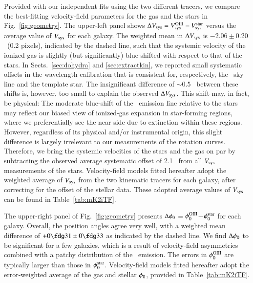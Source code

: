 \documentclass[traditabstract]{aa} %
\begin{document}
Provided with our independent fits using the two different tracers, we compare
the best-fitting velocity-field parameters for the gas and the stars in
Fig.~\ref{fig:geometry}. The upper-left panel shows $\Delta V_{\rm sys}=V_{\rm sys}^{\rm
OIII}-V_{\rm sys}^{\rm star}$ versus the average value of $V_{\rm sys}$ for each galaxy.
The weighted mean in $\Delta V_{\rm sys}$ is $-2.06 \pm 0.20$ \kms\ (0.2 pixels),
indicated by the dashed line, such that the systemic velocity of the ionized gas
is slightly (but significantly) blue-shifted with respect to that of the stars.
In Sects.~\ref{sec:dohydra} and \ref{sec:extractkin}, we reported small
systematic offsets in the wavelength calibration that is consistent for,
respectively, the \none\ sky line and the template star. The insignificant
difference of $\sim0.5$ \kms\ between these shifts is, however, too small to
explain the observed $\Delta V_{\rm sys}$.  This shift may, in fact, be physical: The
moderate blue-shift of the \oiii\ emission line relative to the stars may
reflect our biased view of ionized-gas expansion in star-forming regions, where
we preferentially see the near side due to extinction within these regions.
However, regardless of its physical and/or instrumental origin, this slight
difference is largely irrelevant to our measurements of the rotation curves.
Therefore, we bring the systemic velocities of the stars and the gas on par by
subtracting the observed average systematic offset of 2.1 \kms\ from all $V_{\rm sys}$
measurements of the stars.  Velocity-field models fitted hereafter adopt the
weighted average of $V_{\rm sys}$ from the two kinematic tracers for each galaxy,
after correcting for the offset of the stellar data.  These adopted average
values of $V_{\rm sys}$ can be found in Table~\ref{tab:mK2iTF}. 

The upper-right panel of Fig.~\ref{fig:geometry} presents
$\Delta \phi_0$$=$$\phi_0^{\rm OIII}$$-$$\phi_0^{\rm star}$
for each galaxy.  Overall, the position angles agree very
well, with a weighted mean difference of $+0\fdg31\pm0\fdg33$ as indicated by
the dashed line.  We find $\Delta \phi_0$ to be significant for a few galaxies,
which is a result of velocity-field asymmetries combined with a patchy
distribution of the \oiii\ emission.  The errors in $\phi_0^{\rm OIII}$ are
typically larger than those in $\phi_0^{\rm star}$.  Velocity-field models fitted
hereafter adopt the error-weighted average of the gas and stellar $\phi_0$,
provided in Table~\ref{tab:mK2iTF}. 
\end{document}

